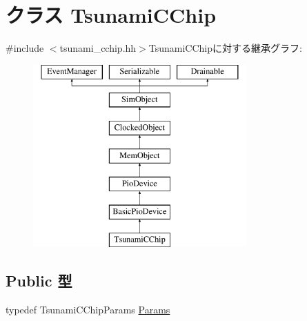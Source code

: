 \hypertarget{classTsunamiCChip}{
\section{クラス TsunamiCChip}
\label{classTsunamiCChip}
}


{\ttfamily \#include $<$tsunami\_\-cchip.hh$>$}TsunamiCChipに対する継承グラフ:\begin{figure}[H]
\begin{center}
\leavevmode
\includegraphics[height=7cm]{classTsunamiCChip}
\end{center}
\end{figure}
\subsection*{Public 型}
\begin{DoxyCompactItemize}
\item 
typedef TsunamiCChipParams \hyperlink{classTsunamiCChip_ae88d115af4688355c68945ae8486b7ec}{Params}
\end{DoxyCompactItemize}
